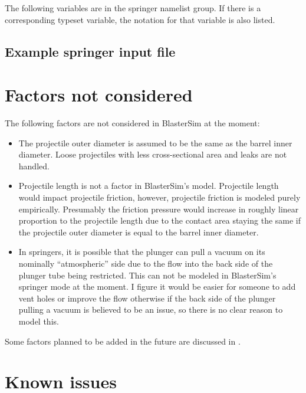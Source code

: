 The following variables are in the springer namelist group.
If there is a corresponding typeset variable, the notation for that variable is also listed.



\subsection{Example springer input file}\label{springer-example}



\section{Factors not considered}\label{not-considered}

The following factors are not considered in BlasterSim at the moment:
\begin{itemize}
\item The projectile outer diameter is assumed to be the same as the barrel inner diameter.
Loose projectiles with less cross-sectional area and leaks are not handled.
\item Projectile length is not a factor in BlasterSim's model.
Projectile length would impact projectile friction, however, projectile friction is modeled purely empirically.
Presumably the friction pressure would increase in roughly linear proportion to the projectile length due to the contact area staying the same if the projectile outer diameter is equal to the barrel inner diameter.
\item In springers, it is possible that the plunger can pull a vacuum on its nominally ``atmospheric'' side due to the flow into the back side of the plunger tube being restricted.
This can not be modeled in BlasterSim's springer mode at the moment.
I figure it would be easier for someone to add vent holes or improve the flow otherwise if the back side of the plunger pulling a vacuum is believed to be an issue, so there is no clear reason to model this.
\end{itemize}

Some factors planned to be added in the future are discussed in .

\section{Known issues}\label{known-issues}
\iflatexml\else%
\warningside%
\fi%

